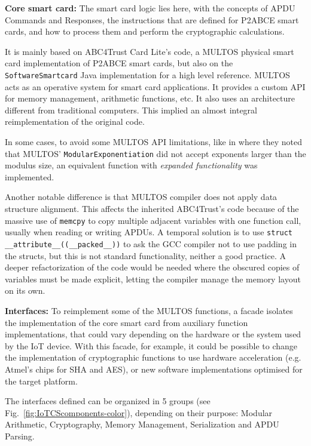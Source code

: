 \textbf{Core smart card:} The smart card logic lies here, with the concepts of APDU Commands and Responses, the instructions that are defined for P2ABCE smart cards, and how to process them and perform the cryptographic calculations.

It is mainly based on ABC4Trust Card Lite's code, a MULTOS physical smart card implementation of P2ABCE smart cards, but also on the \texttt{SoftwareSmartcard} Java implementation for a high level reference. MULTOS acts as an operative system for smart card applications. It provides a custom API for memory management, arithmetic functions, etc. It also uses an architecture different from traditional computers. This implied an almost integral reimplementation of the original code.

In some cases, to  avoid some MULTOS API limitations, like in \cite{vullers2013efficient} where they noted that MULTOS' \texttt{ModularExponentiation} did not accept exponents larger than the modulus size, an equivalent function with \textit{expanded functionality} was implemented. 

Another notable difference is that MULTOS compiler does not apply data structure alignment. This affects the inherited ABC4Trust's code because of the massive use of \texttt{memcpy} to copy multiple adjacent variables with one function call, usually when reading or writing APDUs. 
A temporal solution is to use \texttt{struct \_\_attribute\_\_((\_\_packed\_\_))} to ask the GCC compiler not to use padding in the structs, but this is not standard functionality, neither a good practice. A deeper refactorization of the code would be needed where the obscured copies of variables must be made explicit, letting the compiler manage the memory layout on its own.

\hfil

\textbf{Interfaces:} To reimplement some of the MULTOS functions, a facade isolates the implementation of the core smart card from auxiliary function implementations, that could vary depending on the hardware or the system used by the IoT device.
With this facade, for example, it could be possible to change the implementation of cryptographic functions to use hardware acceleration (e.g. Atmel's chips for SHA and AES), or new software implementations optimised for the target platform.

The interfaces defined can be organized in 5 groups (see Fig.~\ref{fig:IoTCScomponents-color}), depending on their purpose: Modular Arithmetic, Cryptography, Memory Management, Serialization and APDU Parsing.

